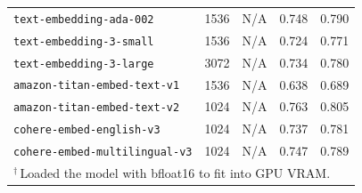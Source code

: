 \begin{table}[!t]
\begin{tabular}{lcccc}
    \texttt{text-embedding-ada-002} & 1536 & N/A & 0.748 & 0.790 \\
    \texttt{text-embedding-3-small} & 1536 & N/A & 0.724 & 0.771 \\
    \texttt{text-embedding-3-large} & 3072 & N/A & 0.734 & 0.780 \\
    \texttt{amazon-titan-embed-text-v1} & 1536 & N/A & 0.638 & 0.689 \\
    \texttt{amazon-titan-embed-text-v2} & 1024 & N/A & 0.763 & 0.805 \\
    \texttt{cohere-embed-english-v3} & 1024 & N/A & 0.737 & 0.781 \\
    \texttt{cohere-embed-multilingual-v3} & 1024 & N/A & 0.747 & 0.789 \\
    \bottomrule
\multicolumn{5}{l}{\footnotesize $^{\dagger}$\,Loaded the model with bfloat16 to fit into GPU VRAM.}\\\end{tabular}
\end{table}